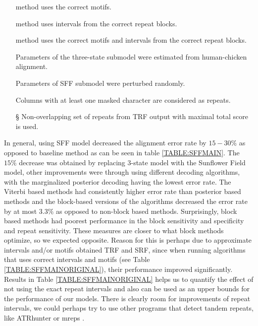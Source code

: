 \begin{itemize}[itemsep=-1mm]

\item[\M] method uses the correct motifs. 

\item[\D] method uses intervals from the correct repeat blocks.

\item[\MM] method uses the correct motifs and intervals from the
correct repeat blocks.

\item[\R] Parameters of the three-state submodel were estimated from
human-chicken alignment. 

\item[\RR] Parameters of SFF submodel were perturbed randomly.

\item[\DD] Columns with at least one masked character are considered as
repeats.

\item[\S] Non-overlapping set of repeats from TRF output with maximal total
score is used.

\end{itemize}

In general, using SFF model decreased the alignment error rate by $15-30\%$ as
opposed to baseline method as can be seen in table \ref{TABLE:SFFMAIN}. The
$15\%$ decrease was obtained by replacing 3-state model with the Sunflower Field
model, other improvements were through using different decoding algorithms,
with the marginalized posterior decoding having the lowest error rate. The
Viterbi based methods had consistently higher error rate than posterior based
methods and the block-based versions of the algorithms decreased the error rate
by at most $3.3\%$ as opposed to non-block based methods. Surprisingly, block
based methods had poorest performance in the block sensitivity and specificity
and repeat sensitivity. These measures are closer to what block methods
optimize, so we expected opposite. Reason for this is perhaps due to
approximate {intervals and/or motifs obtained TRF and SRF}, since when running
algorithms that uses correct intervals and motifs (see Table
\ref{TABLE:SFFMAINORIGINAL}), their performance improved significantly.
Results in Table \ref{TABLE:SFFMAINORIGINAL} helps us to quantify the effect of
not using the exact repeat intervals and also can be used as an upper bounds
for the performance of our models. There is clearly room for improvements of
repeat intervals, we could perhaps try to use other programs that detect tandem
repeats, like ATRhunter \cite{Wexler2005} or mreps \cite{Kolpakov2003}.

